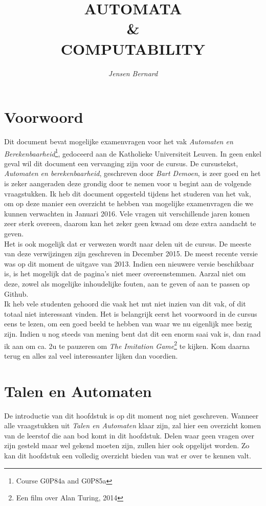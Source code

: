 \documentclass[10pt,a4paper]{article}
\title{AUTOMATA \\ \& \\ COMPUTABILITY}
\author{\emph{Jensen Bernard}}
\begin{document}
\maketitle

\section*{Voorwoord}

Dit document bevat mogelijke examenvragen voor het vak \emph{Automaten en Berekenbaarheid}\footnote{Course G0P84a and G0P85a}, gedoceerd aan de Katholieke Universiteit Leuven. In geen enkel geval wil dit document een vervanging zijn voor de cursus. De cursustekst, \emph{Automaten en berekenbaarheid}, geschreven door \emph{Bart Demoen}, is zeer goed en het is zeker aangeraden deze grondig door te nemen voor u begint aan de volgende vraagstukken.
Ik heb dit document opgesteld tijdens het studeren van het vak, om op deze manier een overzicht te hebben van mogelijke examenvragen die we kunnen verwachten in Januari 2016. Vele vragen uit verschillende jaren komen zeer sterk overeen, daarom kan het zeker geen kwaad om deze extra aandacht te geven.
\\

Het is ook mogelijk dat er verwezen wordt naar delen uit de cursus. De meeste van deze verwijzingen zijn geschreven in December 2015. De meest recente versie was op dit moment de uitgave van 2013. Indien een nieuwere versie beschikbaar is, is het mogelijk dat de pagina's niet meer overeenstemmen. Aarzal niet om deze, zowel als mogelijke inhoudelijke fouten, aan te geven of aan te passen op Github.
\\

Ik heb vele studenten gehoord die vaak het nut niet inzien van dit vak, of dit totaal niet interessant vinden. Het is belangrijk eerst het voorwoord in de cursus eens te lezen, om een goed beeld te hebben van waar we nu eigenlijk mee bezig zijn. Indien u nog steeds van mening bent dat dit een enorm saai vak is, dan raad ik aan om ca. 2u te pauzeren om \emph{The Imitation Game}\footnote{Een film over Alan Turing, 2014} te kijken. Kom daarna terug en alles zal veel interessanter lijken dan voordien.

\newpage

\section{Talen en Automaten}

De introductie van dit hoofdstuk is op dit moment nog niet geschreven. Wanneer alle vraagstukken uit \emph{Talen en Automaten} klaar zijn, zal hier een overzicht komen van de leerstof die aan bod komt in dit hoofdstuk. Delen waar geen vragen over zijn gesteld maar wel gekend moeten zijn, zullen hier ook opgelijst worden. Zo kan dit hoofdstuk een volledig overzicht bieden van wat er over te kennen valt.
\newpage
\end{document}
